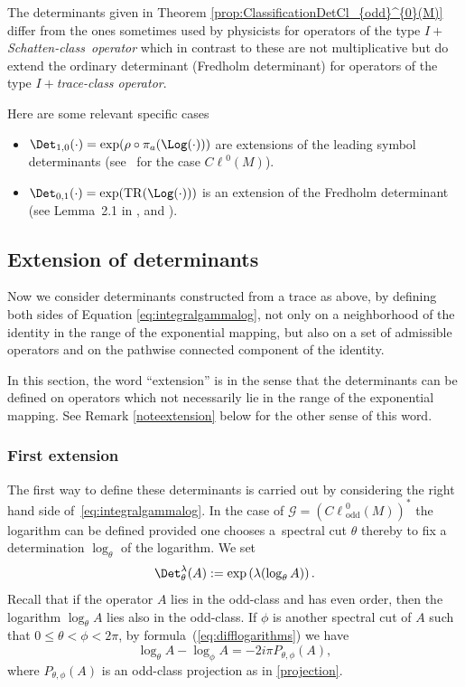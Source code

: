 \documentclass[pdftex]{sigma}
\DeclareMathOperator{\TR}{TR} \DeclareMathOperator{\Op}{Op}
\DeclareMathOperator{\odd}{odd} \DeclareMathOperator{\supp}{supp}
\def \Cl {{C\ell}}
\begin{document}
The determinants given in Theorem \ref{prop:ClassificationDetCl_{odd}^{0}(M)} dif\/fer from the ones sometimes used by physicists for operators of the type $I+$\textit{Schatten-class\ operator} \cite{Mic,simon} which in contrast to these are not multiplicative but do extend the ordinary determinant (Fredholm determinant) for operators of the type $I+$\textit{trace-class operator}.

Here are some relevant specif\/ic cases
\begin{itemize}\itemsep=0pt
\item $\Det_{1,0}(\cdot)=\exp (\rho\circ\pi_a(\Log(\cdot)) )$ are extensions of the leading symbol determinants (see~\cite{rosenberg} for the case $\Cl^{0}(M)$).
\item $\Det_{0,1}(\cdot)=\exp (\TR(\Log(\cdot)) )$ is an extension of the Fredholm determinant (see Lemma~2.1 in \cite{scottres}, and \cite{simon}).
\end{itemize}

\subsection{Extension of determinants}\label{subsectionanotherconstructiondet}

Now we consider determinants constructed from a trace as above, by def\/ining both sides of Equation \eqref{eq:integralgammalog}, not only on a neighborhood of the identity in the range of the exponential mapping, but also on a set of admissible operators and on the pathwise connected component of the identity.

\begin{remark}
In this section, the word ``extension'' is in the sense that the determinants can be def\/ined on operators which not necessarily lie in the range of the exponential mapping. See Remark \ref{noteextension} below for the other sense of this word.
\end{remark}

\subsubsection{First extension}\label{subsectionfirstextension}

The f\/irst way to def\/ine these determinants is carried out by considering the right hand side of~\eqref{eq:integralgammalog}. In the case of ${\mathcal{G}}=\left(\Cl^{0}_{\odd}(M)\right)^*$ the logarithm can be def\/ined provided one chooses a~spectral cut $\theta$ thereby to f\/ix a determination $\log_\theta$ of the logarithm. We set
\begin{gather}
\Det^\lambda_\theta(A):= {\exp}\left(\lambda(\log_\theta A)\right). \label{Detlambda}
\end{gather}
Recall that if the operator $A$ lies in the odd-class and has even order, then the logarithm $\log_\theta A$ lies also in the odd-class. If $\phi$ is another spectral cut of $A$ such that $0\leq\theta<\phi<2\pi$, by formula~(\ref{eq:difflogarithms})
we have
\[
\log_\theta A-\log_\phi A= -2i\pi P_{\theta, \phi}(A),
\]
where $P_{\theta, \phi}(A)$ is an odd-class projection as in \eqref{projection}.
\end{document}
